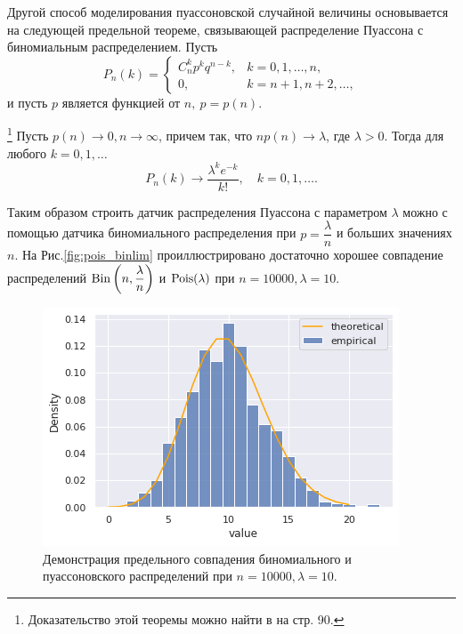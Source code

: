 Другой способ моделирования пуассоновской случайной величины основывается на 
 следующей предельной теореме, связывающей распределение Пуассона с биномиальным
 распределением.
Пусть
$$
P_n(k) = 
\begin{cases}
	C_n^k p^k q^{n-k}, & k = 0, 1, \dots, n,\\
	0, & k = n + 1, n + 2, \dots, 
\end{cases}
$$
и пусть $ p $ является функцией от $ n, \ p = p(n) $.
\begin{theorem}[Пуассона]\footnote{Доказательство этой теоремы можно найти в
	 \cite{shir_prob} на стр. 90.}
	Пусть $ p(n) \to 0, n \to \infty $, причем так, что $ n p(n) \to \lambda $,
	 где $ \lambda > 0 $. Тогда для любого $ k = 0, 1, \dots $
	$$
	P_n(k) \to \dfrac{\lambda^k e^{-k}}{k!}, \quad k = 0, 1, \dots .
	$$
\end{theorem}
Таким образом строить датчик распределения Пуассона с параметром $ \lambda $
 можно с помощью датчика биномиального распределения при $ p =
 \dfrac{\lambda}{n} $ и больших значениях $ n $. На Рис.\eqref{fig:pois_binlim}
 проиллюстрировано достаточно хорошее совпадение распределений $ \operatorname{\mathrm{Bin}}\left( n,
 \dfrac{\lambda}{n} \right) $ и $ \operatorname{\mathrm{Pois}}(\lambda) $ при $ n = 10000, \lambda = 10 $.

\begin{figure}[ht]
	\centering
	\includegraphics[width = 0.8\linewidth]{"./resources/pois_binlim.png"}
	\caption{Демонстрация предельного совпадения биномиального и пуассоновского
	 распределений при $ n = 10000, \lambda = 10 $.}
    \label{fig:pois_binlim}
\end{figure}

